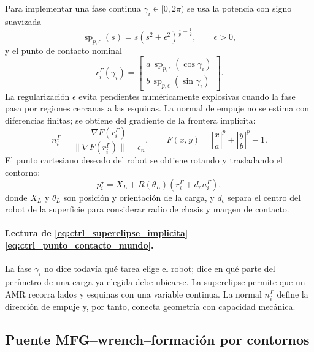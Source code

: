 Para implementar una fase continua $\gamma_i\in[0,2\pi)$ se usa la potencia con signo
suavizada
\begin{equation}
  \operatorname{sp}_{p,\epsilon}(s)
  =
  s(s^2+\epsilon^2)^{\frac1p-\frac12},
  \qquad \epsilon>0,
  \label{eq:ctrl_potencia_signada}
\end{equation}
y el punto de contacto nominal
\begin{equation}
  r_i^\Gamma(\gamma_i)
  =
  \begin{bmatrix}
    a\,\operatorname{sp}_{p,\epsilon}(\cos\gamma_i)\\
    b\,\operatorname{sp}_{p,\epsilon}(\sin\gamma_i)
  \end{bmatrix}.
  \label{eq:ctrl_superelipse_parametrica}
\end{equation}
La regularización $\epsilon$ evita pendientes numéricamente explosivas cuando la fase
pasa por regiones cercanas a las esquinas. La normal de empuje no se estima con
diferencias finitas; se obtiene del gradiente de la frontera implícita:
\begin{equation}
  n_i^\Gamma
  =
  \frac{\nabla F(r_i^\Gamma)}
       {\|\nabla F(r_i^\Gamma)\|+\epsilon_n},
  \qquad
  F(x,y)=
  \left|\frac{x}{a}\right|^p+
  \left|\frac{y}{b}\right|^p-1 .
  \label{eq:ctrl_normal_superelipse}
\end{equation}
El punto cartesiano deseado del robot se obtiene rotando y trasladando el contorno:
\begin{equation}
  p_i^\star
  =
  X_L
  +
  R(\theta_L)
  \left(r_i^\Gamma+d_c n_i^\Gamma\right),
  \label{eq:ctrl_punto_contacto_mundo}
\end{equation}
donde $X_L$ y $\theta_L$ son posición y orientación de la carga, y $d_c$ separa el centro
del robot de la superficie para considerar radio de chasis y margen de contacto.

\paragraph{Lectura de \eqref{eq:ctrl_superelipse_implicita}--\eqref{eq:ctrl_punto_contacto_mundo}.}
La fase $\gamma_i$ no dice todavía qué tarea elige el robot; dice en qué parte del
perímetro de una carga ya elegida debe ubicarse. La superelipse permite que un AMR
recorra lados y esquinas con una variable continua. La normal $n_i^\Gamma$ define la
dirección de empuje y, por tanto, conecta geometría con capacidad mecánica.

\subsection{Puente MFG--wrench--formación por contornos}
\label{subsec:control-puente-mfg-wrench}

